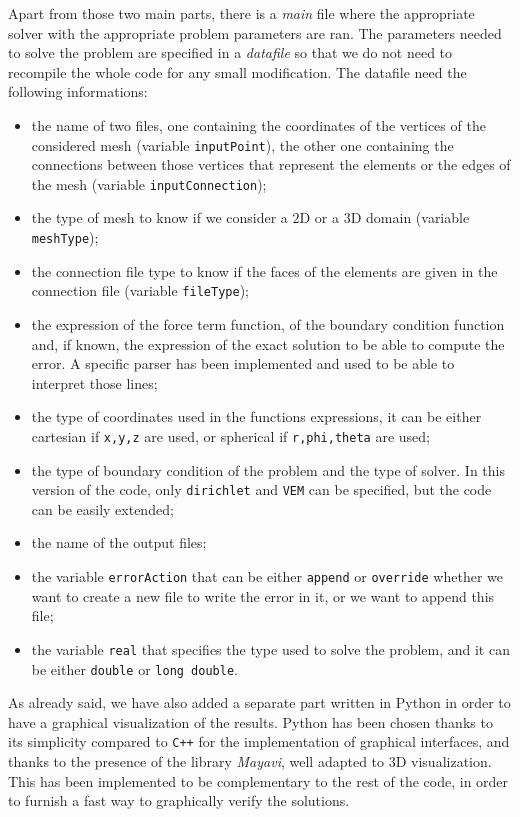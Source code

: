 Apart from those two main parts, there is a \textit{main} file where the appropriate solver with the appropriate problem parameters are ran. The parameters needed to solve the problem are specified in a \textit{datafile} so that we do not need to recompile the whole code for any small modification. The datafile need the following informations: 
\begin{itemize}
\item the name of two files, one containing the coordinates of the vertices of the considered mesh (variable \verb!inputPoint!), the other one containing the connections between those vertices that represent the elements or the edges of the mesh (variable \verb!inputConnection!);
\item the type of mesh to know if we consider a $2$D or a $3$D domain (variable \verb!meshType!);
\item the connection file type to know if the faces of the elements are given in the connection file (variable \verb!fileType!);
\item the expression of the force term function, of the boundary condition function and, if known, the expression of the exact solution to be able to compute the error. A specific parser has been implemented and used to be able to interpret those lines;
\item the type of coordinates used in the functions expressions, it can be either cartesian if \verb!x,y,z! are used, or spherical if \verb!r,phi,theta! are used;
\item the type of boundary condition of the problem and the type of solver. In this version of the code, only \verb!dirichlet! and \verb!VEM! can be specified, but the code can be easily extended;
\item the name of the output files;
\item the variable \verb!errorAction! that can be either \verb!append! or \verb!override! whether we want to create a new file to write the error in it, or we want to append this file;
\item the variable \verb!real! that specifies the type used to solve the problem, and it can be either \verb!double! or \verb!long double!. 
\end{itemize}

As already said, we have also added a separate part written in Python in order to have a graphical visualization of the results. Python has been chosen thanks to its simplicity compared to \verb!C++! for the implementation of graphical interfaces, and thanks to the presence of the library \textit{Mayavi}, well adapted to $3$D visualization. This has been implemented to be complementary to the rest of the code, in order to furnish a fast way to graphically verify  the solutions. 

